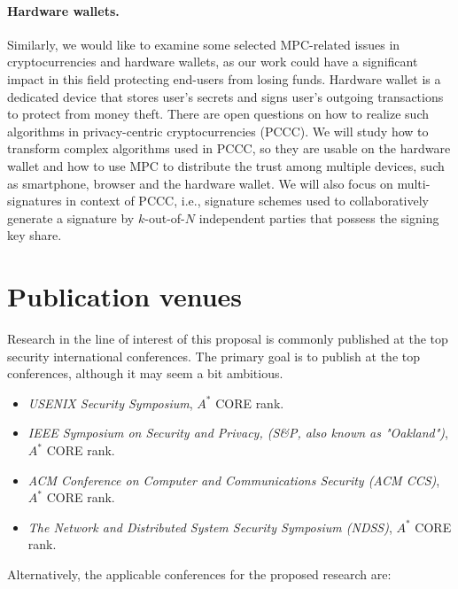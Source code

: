 \documentclass[
  digital, %
  twoside, %
  table,   %
  lof,     %
  lot,     %
]{fithesis3}
\newcounter{ph4_show_guides}
\theoremstyle{definition}
\theoremstyle{remark}
\begin{document}
\paragraph{Hardware wallets.}%
Similarly, we would like to examine some selected MPC-related issues in cryptocurrencies and hardware wallets, as our work could have a significant impact in this field protecting end-users from losing funds. 
Hardware wallet is a dedicated device that stores user's secrets and signs user's outgoing transactions to protect from money theft. There are open questions on how to realize such algorithms in privacy-centric cryptocurrencies (PCCC).
We will study how to transform complex algorithms used in PCCC, so they are usable on the hardware wallet and how to use MPC to distribute the trust among multiple devices, such as smartphone, browser and the hardware wallet. We will also focus on multi-signatures in context of PCCC, i.e., signature schemes used to collaboratively generate a signature by $k$-out-of-$N$ independent parties that possess the signing key share.


\section{Publication venues}
Research in the line of interest of this proposal is commonly published at the top security international conferences. The primary goal is to publish at the top conferences, although it may seem a bit ambitious.

\begin{itemize}
	\item \emph{USENIX Security Symposium}, $A^*$ CORE rank.
	
	\item \emph{IEEE Symposium on Security and Privacy, (S\&P, also known as "Oakland")}, $A^*$ CORE rank.
	
	\item \emph{ACM Conference on Computer and Communications Security (ACM CCS)}, $A^*$ CORE rank.
	
	\item \emph{The Network and Distributed System Security Symposium (NDSS)}, $A^*$ CORE rank.
\end{itemize}

Alternatively, the applicable conferences for the proposed research are:
\end{document}
